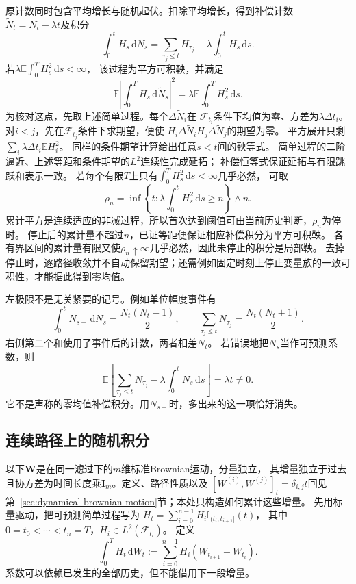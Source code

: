 原计数同时包含平均增长与随机起伏。扣除平均增长，得到补偿计数
$\widetilde N_t=N_t-\lambda t$及积分
\begin{equation}
  \int_0^t H_s\,\mathrm d\widetilde N_s
    =\sum_{\tau_j\leq t}H_{\tau_j}
      -\lambda\int_0^t H_s\,\mathrm ds.
  \label{eq:action-state-compensated-poisson}
\end{equation}
若$\lambda\mathbb E\int_0^T H_s^2\,\mathrm ds<\infty$，
该过程为平方可积鞅，并满足
\begin{equation}
  \mathbb E\left|\int_0^T H_s\,\mathrm d\widetilde N_s\right|^2
       =\lambda\mathbb E\int_0^T H_s^2\,\mathrm ds.
  \label{eq:action-state-poisson-isometry}
\end{equation}
为核对这点，先取上述简单过程。每个$\Delta\widetilde N_i$在
$\mathcal F_{t_i}$条件下均值为零、方差为$\lambda\Delta t_i$。
对$i<j$，先在$\mathcal F_{t_j}$条件下求期望，便使
$H_i\Delta\widetilde N_iH_j\Delta\widetilde N_j$的期望为零。
平方展开只剩$\sum_i\lambda\Delta t_i\mathbb E H_i^2$。
同样的条件期望计算给出任意$s<t$间的鞅等式。
简单过程的二阶逼近、上述等距和条件期望的$L^2$连续性完成延拓；
补偿恒等式保证延拓与有限跳跃和表示一致。
若每个有限$T$上只有$\int_0^T H_s^2\,\mathrm ds<\infty$几乎必然，
可取
\[
 \rho_n=\inf\left\{t:\lambda\int_0^tH_s^2\,\mathrm ds\geq n\right\}\wedge n.
\]
累计平方是连续适应的非减过程，所以首次达到阈值可由当前历史判断，$\rho_n$为停时。
停止后的累计量不超过$n$，已证等距便保证相应补偿积分为平方可积鞅。
各有界区间的累计量有限又使$\rho_n\uparrow\infty$几乎必然，因此未停止的积分是局部鞅。
去掉停止时，逐路径收敛并不自动保留期望；还需例如固定时刻上停止变量族的一致可积性，才能据此得到零均值。

左极限不是无关紧要的记号。例如单位幅度事件有
\[
  \int_0^t N_{s-}\,\mathrm dN_s=\frac{N_t(N_t-1)}2,\qquad
  \sum_{\tau_j\leq t}N_{\tau_j}=\frac{N_t(N_t+1)}2.
\]
右侧第二个和使用了事件后的计数，两者相差$N_t$。
若错误地把$N_s$当作可预测系数，则
\[
  \mathbb E\left[\sum_{\tau_j\leq t}N_{\tau_j}
       -\lambda\int_0^t N_s\,\mathrm ds\right]=\lambda t\neq0.
\]
它不是声称的零均值补偿积分。用$N_{s-}$时，多出来的这一项恰好消失。

\subsection{连续路径上的随机积分}
以下$\bm W$是在同一滤过下的$m$维标准Brownian运动，分量独立，
其增量独立于过去且协方差为时间长度乘$\bm I_m$。定义、路径性质以及
$[W^{(i)},W^{(j)}]_t=\delta_{i,j}t$回见
第~\ref{sec:dynamical-brownian-motion}节；本处只构造如何累计这些增量。
先用标量驱动，把可预测简单过程写为
$H_t=\sum_{i=0}^{n-1}H_i\mathbb I_{(t_i,t_{i+1}]}(t)$，
其中$0=t_0<\cdots<t_n=T$，$H_i\in L^2(\mathcal F_{t_i})$。
定义
\begin{equation}
  \int_0^T H_t\,\mathrm dW_t
       :=\sum_{i=0}^{n-1}H_i(W_{t_{i+1}}-W_{t_i}).
  \label{eq:dynamical-simple-ito-integral}
\end{equation}
系数可以依赖已发生的全部历史，但不能借用下一段增量。

